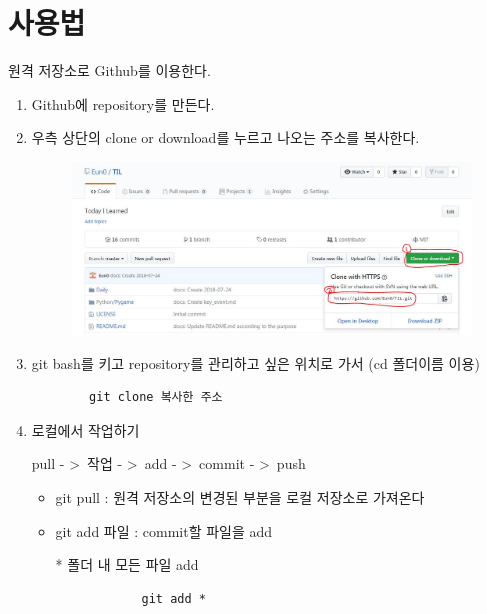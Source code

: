 \documentclass[a4paper]{article}
\begin{document}
	\section{사용법}
	
	원격 저장소로 Github를 이용한다.
	
	\begin{enumerate}
		
		\item Github에 repository를 만든다.
		
		\item 우측 상단의 clone or download를 누르고 나오는 주소를 복사한다.
		
		\begin{figure}[htbp]
			\begin{center}
				\includegraphics[scale=0.4]{source/cl1}
			\end{center}
		\end{figure}
		
		\item git bash를 키고 repository를 관리하고 싶은 위치로 가서 (cd 폴더이름 이용)
		
		
		
		\begin{verbatim}
		git clone 복사한 주소
		\end{verbatim}	
		
		
		\item 로컬에서 작업하기
		
		pull - \textgreater\, 작업 - \textgreater\, add - \textgreater\, commit - \textgreater\, push
		
		\begin{itemize}
			\item git pull : 원격 저장소의 변경된 부분을 로컬 저장소로 가져온다
			\item git add 파일 : commit할 파일을 add
			
			* 폴더 내 모든 파일 add
			
			\begin{verbatim}
			git add *
			\end{verbatim}
			

\end{itemize}
\end{enumerate}
\end{document}
